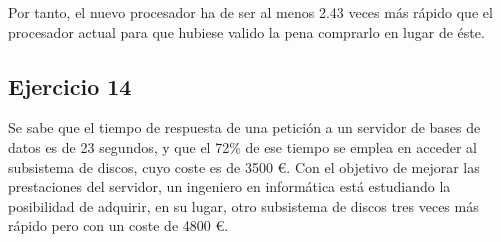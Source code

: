 Por tanto, el nuevo procesador ha de ser al menos 2.43 veces más rápido que el procesador actual para que hubiese valido la pena comprarlo en lugar de éste.

\subsection*{Ejercicio 14}

Se sabe que el tiempo de respuesta de una petición a un servidor de bases de datos es de 23 segundos, y que el 72\% de ese tiempo se emplea en acceder al subsistema de discos, cuyo coste es de 3500 \euro. Con el objetivo de mejorar las prestaciones del servidor, un ingeniero en informática está estudiando la posibilidad de adquirir, en su lugar, otro subsistema de discos tres veces más rápido pero con un coste de 4800 \euro.

